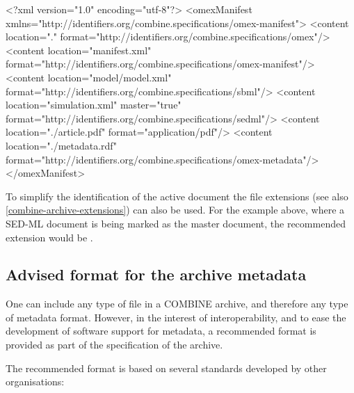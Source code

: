 \begin{example}
<?xml version="1.0" encoding="utf-8"?>
<omexManifest xmlns="http://identifiers.org/combine.specifications/omex-manifest">
    <content location="." 
		         format="http://identifiers.org/combine.specifications/omex"/>
    <content location="manifest.xml" 
		         format="http://identifiers.org/combine.specifications/omex-manifest"/>
    <content location="model/model.xml" 
		         format="http://identifiers.org/combine.specifications/sbml"/>
    <content location="simulation.xml" master="true"
		         format="http://identifiers.org/combine.specifications/sedml"/>
    <content location="./article.pdf" 
		         format="application/pdf"/>
    <content location="./metadata.rdf" 
		         format="http://identifiers.org/combine.specifications/omex-metadata"/>
</omexManifest>
\end{example}

To simplify the identification of the active document the file extensions 
(see also \ref{combine-archive-extensions}) can also be used. For the example above, 
where a SED-ML document is being marked as the master document, the 
recommended extension would be . 

\subsection{Advised format for the archive metadata}

One can include any type of file in a COMBINE archive, and therefore any 
type of metadata format. However, in the interest of interoperability, 
and to ease the development of software support for metadata, a 
recommended format is provided as part of the specification of the 
archive. 

The recommended format is based on several standards developed by other 
organisations: 

